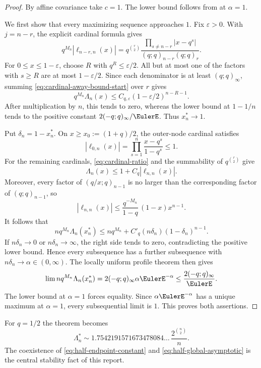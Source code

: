 \documentclass[11pt,oneside]{book}
\numberwithin{equation}{chapter}
\theoremstyle{definition}
\theoremstyle{remark}
\newcommand{\Leb}{\Lambda}
\begin{document}
\begin{proof}
By affine covariance take $c=1$.  The lower bound follows from
 at $\alpha=1$.

We first show that every maximizing sequence approaches $1$.  Fix
$\varepsilon>0$.  With $j=n-r$, the explicit cardinal formula gives
\begin{equation}
 q^{M_n}|\ell_{n-r,n}(x)|
 =q^{\binom r2}
  \frac{\prod_{s\ne n-r}|x-q^s|}
       {(q;q)_{n-r}(q;q)_r}.
 \label{eq:cardinal-away-bound-start}
\end{equation}
For $0\le x\le1-\varepsilon$, choose $R$ with $q^R\le\varepsilon/2$.
All but at most one of the factors with $s\ge R$ are at most
$1-\varepsilon/2$.  Since each denominator is at least
$(q;q)_\infty$, summing \eqref{eq:cardinal-away-bound-start} over $r$ gives
\[
 q^{M_n}\Leb_n(x)
 \le C_{q,\varepsilon}(1-\varepsilon/2)^{n-R-1}.
\]
After multiplication by $n$, this tends to zero, whereas the lower bound at
$1-1/n$ tends to the positive constant $2(-q;q)_\infty/\EulerE$.  Thus
$x_n^*\to1$.

Put $\delta_n=1-x_n^*$.  On
$x\ge x_0:=(1+q)/2$, the outer-node cardinal satisfies
\[
 |\ell_{0,n}(x)|
 =\prod_{s=1}^n\frac{x-q^s}{1-q^s}\le1.
\]
For the remaining cardinals, \eqref{eq:cardinal-ratio} and the summability of
$q^{\binom r2}$ give
\[
 \Leb_n(x)\le1+C_q|\ell_{n,n}(x)|.
\]
Moreover, every factor of $(q/x;q)_{n-1}$ is no larger than the
corresponding factor of $(q;q)_{n-1}$, so
\begin{equation}
 |\ell_{n,n}(x)|
 \le\frac{q^{-M_n}}{1-q}\,(1-x)x^{n-1}.
 \label{eq:last-cardinal-envelope}
\end{equation}
It follows that
\[
 nq^{M_n}\Leb_n(x_n^*)
 \le nq^{M_n}+C'_q(n\delta_n)(1-\delta_n)^{n-1}.
\]
If $n\delta_n\to0$ or $n\delta_n\to\infty$, the right side tends to zero,
contradicting the positive lower bound.  Hence every subsequence has a
further subsequence with $n\delta_n\to\alpha\in(0,\infty)$.  The locally
uniform profile theorem then gives
\[
 \lim nq^{M_n}\Leb_n(x_n^*)
 =2(-q;q)_\infty\alpha\EulerE^{-\alpha}
 \le\frac{2(-q;q)_\infty}{\EulerE}.
\]
The lower bound at $\alpha=1$ forces equality.  Since
$\alpha\EulerE^{-\alpha}$ has a unique maximum at $\alpha=1$, every subsequential
limit is $1$.  This proves both assertions.
\end{proof}

For $q=1/2$ the theorem becomes
\begin{equation}
 \Leb_n^*
 \sim 1.7542191571673478084\ldots\,
       \frac{2^{\binom n2}}{n}.
 \label{eq:half-global-asymptotic}
\end{equation}
The coexistence of \eqref{eq:half-endpoint-constant} and
\eqref{eq:half-global-asymptotic} is the central stability fact of this
report.
\end{document}
